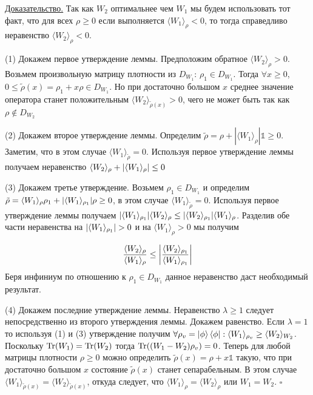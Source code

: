 \underline{Доказательство.} Так как $W_2$ оптимальнее чем $W_1$ мы будем использовать тот факт, что для всех $\rho \geq 0$ если выполняется $\langle W_1 \rangle_{\rho} < 0$, то тогда справедливо неравенство $\langle W_2 \rangle_{\rho} < 0$.

(1) Докажем первое утверждение леммы. Предположим обратное $\langle W_2 \rangle_{\rho} > 0$. Возьмем произвольную матрицу плотности из $D_{W_1}$: $\rho_1 \in D_{W_1}$. Тогда $\forall x \geq 0$, $0 \leq \tilde \rho(x) = \rho_1 + x \rho \in D_{W_1}$. Но при достаточно большом $x$ среднее значение оператора станет положительным $\langle W_2 \rangle_{\tilde \rho(x)} > 0$, чего не может быть так как $\rho \notin D_{W_2}$


(2) Докажем второе утверждение леммы. Определим $\tilde \rho = \rho  + |\langle W_1 \rangle_{\rho}| \mathbb{1} \geq 0$. Заметим, что в этом случае $\langle W_1 \rangle_{\tilde\rho} = 0$. Используя первое утверждение леммы получаем неравенство $\langle W_2 \rangle_{\rho} + \abs{\langle W_1 \rangle_{\rho}} \leq 0$


(3) Докажем третье утверждение. Возьмем $\rho_1 \in D_{W_1}$ и определим $\tilde \rho = \langle W_1 \rangle_{\rho} \rho_1 + \abs{\langle W_1 \rangle_{\rho_1}}\rho \geq 0$, в этом случае $\langle W_1 \rangle_{\tilde \rho} = 0$. Используя первое утверждение леммы получаем $\abs{\langle W_1 \rangle_{\rho_1}}\langle W_2 \rangle_{\rho} \leq \abs{\langle W_2 \rangle_{\rho_1}} \langle W_1 \rangle_{\rho}$. Разделив обе части неравенства на $\abs{\langle W_1 \rangle_{\rho_1}} >0$ и на $\langle W_1 \rangle_{\rho} > 0$ мы получим

\begin{equation}
    \frac{
    \langle W_2 \rangle_{\rho}
    }{
    \langle W_1 \rangle_{\rho}
    }
    \leq
    \abs{
    \frac{
    \langle W_2 \rangle_{\rho_1}
    }{
    \langle W_1 \rangle_{\rho_1}
    }
    }
\end{equation}
Беря инфиниум по отношению к $\rho_1 \in D_{W_1}$ данное неравенство даст необходимый результат.

(4) Докажем последние утверждение леммы. Неравенство $\lambda \geq 1$ следует непосредственно из второго утверждения леммы. Докажем равенство. Если $\lambda = 1$ то используя  (1) и (3) утверждение получим $\forall \rho_v = \ket{\phi}\bra{\phi}: \langle W_1 \rangle_{\rho_v} \geq \langle W_2 \rangle_{W_2}$. Поскольку $\Tr(W_1) = \Tr(W_2)$ тогда $\Tr((W_1 - W_2)\rho_v) = 0$. Теперь для любой матрицы плотности $\rho \geq 0$ можно определить $\tilde \rho(x) = \rho + x \mathbb{1}$ такую, что при достаточно большом $x$ состояние $\tilde \rho(x)$ станет сепарабельным. В этом случае $\langle W_1 \rangle_{\tilde \rho(x)} = \langle W_2 \rangle_{\tilde \rho(x)}$, откуда следует, что $\langle W_1 \rangle_{\rho} = \langle W_2 \rangle_{\rho}$ или $W_1 = W_2$. $\square$


